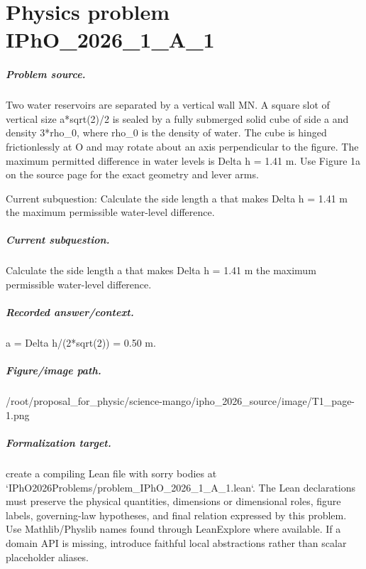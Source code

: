 
\chapter{Physics problem IPhO\_2026\_1\_A\_1}
\label{ch:IPhO2026Problems_problem_IPhO_2026_1_A_1}

\paragraph{Problem source.}
Two water reservoirs are separated by a vertical wall MN.  A square slot of
vertical size a*sqrt(2)/2 is sealed by a fully submerged solid cube of side a
and density 3*rho\_0, where rho\_0 is the density of water.  The cube is hinged
frictionlessly at O and may rotate about an axis perpendicular to the figure.
The maximum permitted difference in water levels is Delta h = 1.41 m.  Use
Figure 1a on the source page for the exact geometry and lever arms.

Current subquestion:
Calculate the side length a that makes Delta h = 1.41 m the maximum permissible water-level difference.

\paragraph{Current subquestion.}
Calculate the side length a that makes Delta h = 1.41 m the maximum permissible water-level difference.

\paragraph{Recorded answer/context.}
a = Delta h/(2*sqrt(2)) = 0.50 m.

\paragraph{Figure/image path.}
/root/proposal\_for\_physic/science-mango/ipho\_2026\_source/image/T1\_page-1.png

\paragraph{Formalization target.}
create a compiling Lean file with sorry bodies at `IPhO2026Problems/problem\_IPhO\_2026\_1\_A\_1.lean`.
The Lean declarations must preserve the physical quantities, dimensions or dimensional roles, figure labels, governing-law hypotheses, and final relation expressed by this problem.
Use Mathlib/Physlib names found through LeanExplore where available. If a domain API is missing, introduce faithful local abstractions rather than scalar placeholder aliases.

